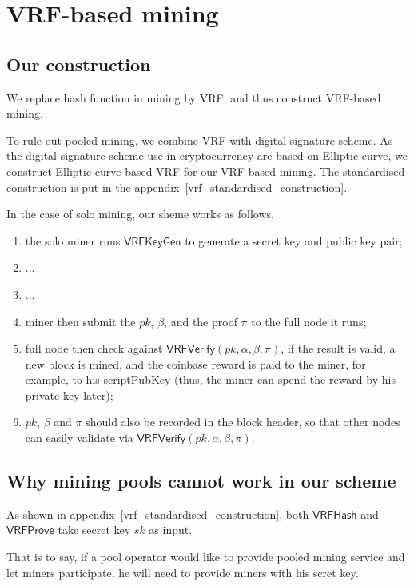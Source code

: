 \section{VRF-based mining}

\subsection{Our construction}

We replace hash function in mining by VRF, and thus construct VRF-based mining.

To rule out pooled mining, we combine VRF with digital signature scheme.
As the digital signature scheme use in cryptocurrency are based on Elliptic curve, we construct Elliptic curve based VRF for our VRF-based mining.
The standardised construction is put in the appendix~\ref{vrf_standardised_construction}.


In the case of solo mining, our sheme works as follows.

\begin{enumerate}
    \item the solo miner runs $\mathsf{VRFKeyGen}$ to generate a secret key and public key pair;
    \item ...
    \item ...
    \item miner then submit the $pk$, $\beta$, and the proof $\pi$ to the full node it runs;
    \item full node then check against $\mathsf{VRFVerify}(pk, \alpha, \beta, \pi)$, if the result is valid, a new block is mined, and the coinbase reward is paid to the miner, for example, to his scriptPubKey (thus, the miner can spend the reward by his private key later);
    \item $pk$, $\beta$ and $\pi$ should also be recorded in the block header, so that other nodes can easily validate via $\mathsf{VRFVerify}(pk, \alpha, \beta, \pi)$.
\end{enumerate}

\subsection{Why mining pools cannot work in our scheme}

As shown in appendix~\ref{vrf_standardised_construction}, both $\mathsf{VRFHash}$ and $\mathsf{VRFProve}$ take secret key $sk$ as input.

That is to say, if a pool operator would like to provide pooled mining service and let miners participate, he will need to provide miners with his scret key.


